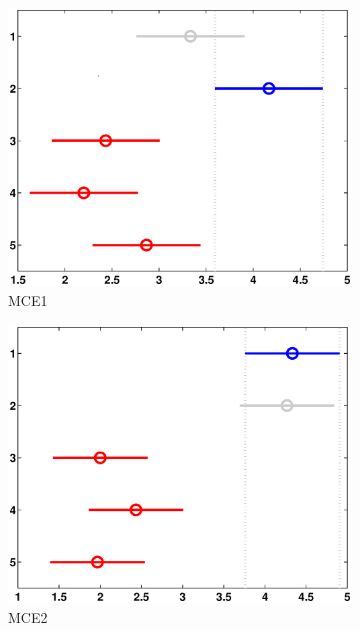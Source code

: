 \begin{figure}
	\centering
	 	\captionsetup{width=.85\linewidth}
	\begin{subfigure}[b]{0.49\linewidth}
		\includegraphics[width=\linewidth]{Figures/A-NMELA_FB_P1}
		\caption{MCE1} \label{fig:M1} 
	\end{subfigure}
	\begin{subfigure}[b]{0.49\linewidth}
		\includegraphics[width=\textwidth]{Figures/A-NMELA_FB_P2}
		\caption{MCE2} \label{fig:M2} 
	\end{subfigure}
	\begin{subfigure}[b]{0.49\linewidth}

\end{subfigure}
\end{figure}
